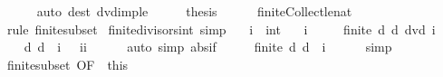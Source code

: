 \begin{isabellebody}
\ \ \ \ \isamarkupfalse%
\ {\isacharparenleft}{\kern0pt}auto\ dest{\isacharcolon}{\kern0pt}\ dvd{\isacharunderscore}{\kern0pt}imp{\isacharunderscore}{\kern0pt}le{\isacharparenright}{\kern0pt}\isanewline
\ \ \isamarkupfalse%
\ \isamarkupfalse%
\ {\isacharquery}{\kern0pt}thesis\isanewline
\ \ \ \ \isamarkupfalse%
\ finite{\isacharunderscore}{\kern0pt}Collect{\isacharunderscore}{\kern0pt}le{\isacharunderscore}{\kern0pt}nat\ \isamarkupfalse%
\ {\isacharparenleft}{\kern0pt}rule\ finite{\isacharunderscore}{\kern0pt}subset{\isacharparenright}{\kern0pt}\isanewline
{}\isamarkupfalse%
%
\endisatagproof
{\isafoldproof}%
%
\isadelimproof
\isanewline
%
\endisadelimproof
\isanewline
{}\isamarkupfalse%
\ finite{\isacharunderscore}{\kern0pt}divisors{\isacharunderscore}{\kern0pt}int\ {\isacharbrackleft}{\kern0pt}simp{\isacharbrackright}{\kern0pt}{\isacharcolon}{\kern0pt}\isanewline
\ \ \ i\ {\isacharcolon}{\kern0pt}{\isacharcolon}{\kern0pt}\ int\isanewline
\ \ \ {\isachardoublequoteopen}i\ {\isasymnoteq}\ {}{\isachardoublequoteclose}\isanewline
\ \ \ {\isachardoublequoteopen}finite\ {\isacharbraceleft}{\kern0pt}d{\isachardot}{\kern0pt}\ d\ dvd\ i{\isacharbraceright}{\kern0pt}{\isachardoublequoteclose}\isanewline
%
\isadelimproof
%
\endisadelimproof
%
\isatagproof
{}\isamarkupfalse%
\ {\isacharminus}{\kern0pt}\isanewline
\ \ \isamarkupfalse%
\ {\isachardoublequoteopen}{\isacharbraceleft}{\kern0pt}d{\isachardot}{\kern0pt}\ {\isasymbar}d{\isasymbar}\ {\isasymle}\ {\isasymbar}i{\isasymbar}{\isacharbraceright}{\kern0pt}\ {\isacharequal}{\kern0pt}\ {\isacharbraceleft}{\kern0pt}{\isacharminus}{\kern0pt}\ {\isasymbar}i{\isasymbar}{\isachardot}{\kern0pt}{\isachardot}{\kern0pt}{\isasymbar}i{\isasymbar}{\isacharbraceright}{\kern0pt}{\isachardoublequoteclose}\isanewline
\ \ \ \ \isamarkupfalse%
\ {\isacharparenleft}{\kern0pt}auto\ simp{\isacharcolon}{\kern0pt}\ abs{\isacharunderscore}{\kern0pt}if{\isacharparenright}{\kern0pt}\isanewline
\ \ \isamarkupfalse%
\ \isamarkupfalse%
\ {\isachardoublequoteopen}finite\ {\isacharbraceleft}{\kern0pt}d{\isachardot}{\kern0pt}\ {\isasymbar}d{\isasymbar}\ {\isasymle}\ {\isasymbar}i{\isasymbar}{\isacharbraceright}{\kern0pt}{\isachardoublequoteclose}\isanewline
\ \ \ \ \isamarkupfalse%
\ simp\isanewline
\ \ \isamarkupfalse%
\ finite{\isacharunderscore}{\kern0pt}subset\ {\isacharbrackleft}{\kern0pt}OF\ {\isacharunderscore}{\kern0pt}\ this{\isacharbrackright}{\kern0pt}\ \isamarkupfalse%

\end{isabellebody}
